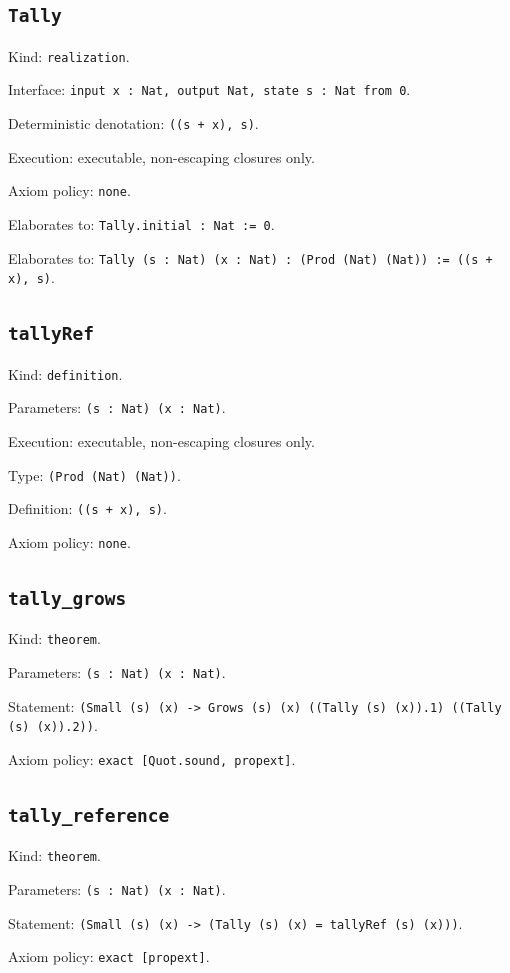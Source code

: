 \documentclass[11pt]{article}
\begin{document}
\subsection*{\texttt{Tally}}
\noindent Kind: \texttt{realization}.\par
\noindent Interface: \texttt{input x : Nat, output Nat, state s : Nat from 0}.\par
\noindent Deterministic denotation: \texttt{((s + x), s)}.\par
\noindent Execution: executable, non-escaping closures only.\par
\noindent Axiom policy: \texttt{none}.\par
\noindent Elaborates to: \texttt{Tally.initial : Nat := 0}.\par
\noindent Elaborates to: \texttt{Tally (s : Nat) (x : Nat) : (Prod (Nat) (Nat)) := ((s + x), s)}.\par
\subsection*{\texttt{tallyRef}}
\noindent Kind: \texttt{definition}.\par
\noindent Parameters: \texttt{(s : Nat) (x : Nat)}.\par
\noindent Execution: executable, non-escaping closures only.\par
\noindent Type: \texttt{(Prod (Nat) (Nat))}.\par
\noindent Definition: \texttt{((s + x), s)}.\par
\noindent Axiom policy: \texttt{none}.\par
\subsection*{\texttt{tally\_grows}}
\noindent Kind: \texttt{theorem}.\par
\noindent Parameters: \texttt{(s : Nat) (x : Nat)}.\par
\noindent Statement: \texttt{(Small (s) (x) -> Grows (s) (x) ((Tally (s) (x)).1) ((Tally (s) (x)).2))}.\par
\noindent Axiom policy: \texttt{exact [Quot.sound, propext]}.\par
\subsection*{\texttt{tally\_reference}}
\noindent Kind: \texttt{theorem}.\par
\noindent Parameters: \texttt{(s : Nat) (x : Nat)}.\par
\noindent Statement: \texttt{(Small (s) (x) -> (Tally (s) (x) = tallyRef (s) (x)))}.\par
\noindent Axiom policy: \texttt{exact [propext]}.\par
\end{document}
